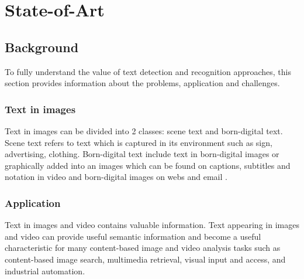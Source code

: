 
\graphicspath{ {1chapterStateOfArt/image/} }
\chapter{State-of-Art} \label{State-of-Art}
\section{Background}

To fully understand the value of text detection and recognition approaches, this section provides information about the problems, application and challenges.
\subsection{Text in images}
Text in images can be divided into 2 classes: scene text and  born-digital text. Scene text refers to text which is captured in its environment such as sign, advertising, clothing. Born-digital text include text in born-digital images or graphically added into an images which can be found on captions, subtitles and notation in video and born-digital images on webs and email \cite{Karatzas.2011.ICDAR}.
\subsection{Application}
\par
Text in images and video contains valuable information. Text appearing in images and video can provide useful semantic information and become a useful characteristic for many content-based image and video analysis tasks such as content-based image search, multimedia retrieval, visual input and access, and industrial automation.

